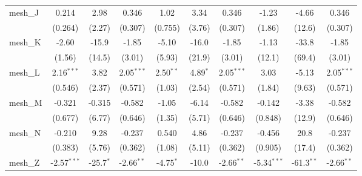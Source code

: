 \begin{tabular}{lccccccccc}
   mesh\_J                                                     & 0.214          & 2.98           & 0.346          & 1.02           & 3.34           & 0.346          & -1.23          & -4.66          & 0.346\\   
                                                               & (0.264)        & (2.27)         & (0.307)        & (0.755)        & (3.76)         & (0.307)        & (1.86)         & (12.6)         & (0.307)\\   
   mesh\_K                                                     & -2.60          & -15.9          & -1.85          & -5.10          & -16.0          & -1.85          & -1.13          & -33.8          & -1.85\\   
                                                               & (1.56)         & (14.5)         & (3.01)         & (5.93)         & (21.9)         & (3.01)         & (12.1)         & (69.4)         & (3.01)\\   
   mesh\_L                                                     & 2.16$^{***}$   & 3.82           & 2.05$^{***}$   & 2.50$^{**}$    & 4.89$^{*}$     & 2.05$^{***}$   & 3.03           & -5.13          & 2.05$^{***}$\\   
                                                               & (0.546)        & (2.37)         & (0.571)        & (1.03)         & (2.54)         & (0.571)        & (1.84)         & (9.63)         & (0.571)\\   
   mesh\_M                                                     & -0.321         & -0.315         & -0.582         & -1.05          & -6.14          & -0.582         & -0.142         & -3.38          & -0.582\\   
                                                               & (0.677)        & (6.77)         & (0.646)        & (1.35)         & (5.71)         & (0.646)        & (0.848)        & (12.9)         & (0.646)\\   
   mesh\_N                                                     & -0.210         & 9.28           & -0.237         & 0.540          & 4.86           & -0.237         & -0.456         & 20.8           & -0.237\\   
                                                               & (0.383)        & (5.76)         & (0.362)        & (1.08)         & (5.11)         & (0.362)        & (0.905)        & (17.4)         & (0.362)\\   
   mesh\_Z                                                     & -2.57$^{***}$  & -25.7$^{*}$    & -2.66$^{**}$   & -4.75$^{*}$    & -10.0          & -2.66$^{**}$   & -5.34$^{***}$  & -61.3$^{**}$   & -2.66$^{**}$\\   

\end{tabular}
